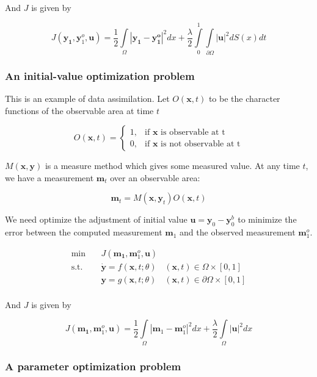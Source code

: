 \documentclass{article}
\begin{document}
And $ J $ is given by

$$
J(\mathbf{y_1}, \mathbf{y}_1^o, \mathbf{u}) = \frac{1}{2} \int\limits_{\Omega}|\mathbf{y_1} - \mathbf{y_1^o}|^2dx +  \frac{\lambda}{2} \int\limits_{0}^{1}\int\limits_{\partial \Omega} |\mathbf{u}|^2 dS(x) dt
$$

\subsubsection{An initial-value optimization problem}

This is an example of data assimilation. Let $ O(\mathbf{x}, t) $ to be the character functions of the observable area at time $t$

$$
O(\mathbf{x}, t) = \begin{cases}
1, & \text{if }\mathbf{x}\text{ is observable at t} \\
0, & \text{if }\mathbf{x}\text{ is not observable at t}
\end{cases}
$$

$ M(\mathbf{x}, \mathbf{y}) $ is a measure method which gives some measured value. At any time $ t $, we have a measurement $\mathbf{m}_t$ over an observable area:

$$ \mathbf{m}_t = M(\mathbf{x}, \mathbf{y}_t) O(\mathbf{x}, t) $$

We need optimize the adjustment of initial value $ \mathbf{u} = \mathbf{y}_0 - \mathbf{y}_0^b $  to minimize the error between the computed measurement $ \mathbf{m}_1 $ and the observed measurement $ \mathbf{m}_1^o $.

$$
\begin{array}{rcll}
\min &~& J(\mathbf{m_1}, \mathbf{m}_1^o, \mathbf{u}) & \\
\mathrm{s.t.} &~& \dot{\mathbf{y}} = f(\mathbf{x}, t; \theta) & (\mathbf{x}, t) \in \Omega \times [0, 1] \\
&~& \mathbf{y} = g(\mathbf{x}, t; \theta) & (\mathbf{x}, t) \in \partial \Omega \times [0, 1] \\
\end{array}
$$

And $ J $ is given by

$$
J(\mathbf{m_1}, \mathbf{m}_1^o, \mathbf{u}) = \frac{1}{2} \int\limits_{\Omega}|\mathbf{m}_1 - \mathbf{m}_1^o|^2 dx + \frac{\lambda}{2} \int\limits_{\Omega}|\mathbf{u}|^2 dx
$$

\subsubsection{A parameter optimization problem}
\end{document}
